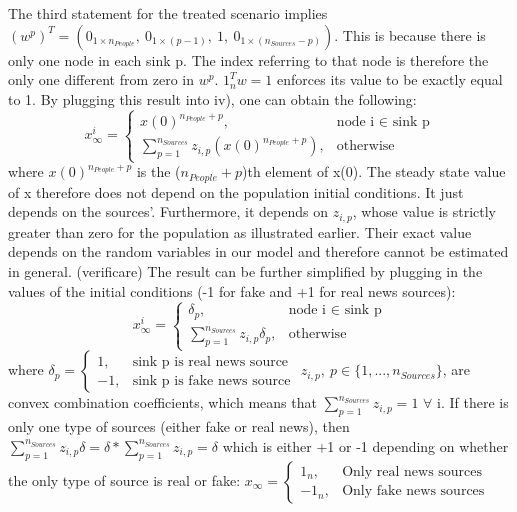 The third statement for the treated scenario implies $(w^p)^T = (0_{1 \times n_{People}},\ 0_{1 \times (p-1)},\ 1,\ 0_{1 \times (n_{Sources}-p)})$. This is because there is only one node in each sink p. The index referring to that node is therefore the only one different from zero in $w^p$. $1_n^Tw=1$ enforces its value to be exactly equal to 1. By plugging this result into iv), one can obtain the following:
$$
x_{\infty}^i = 
\begin{cases}
	x(0)^{n_{People}+p},& \text{node i $\in$ sink p}\\
	\sum_{p=1}^{n_{Sources}} z_{i,p}(x(0)^{n_{People}+p}), & \text{otherwise}
\end{cases}
$$
where $x(0)^{n_{People}+p}$ is the ($n_{People}+p$)th element of x(0). The steady state value of x therefore does not depend on the population initial conditions. It just depends on the sources'. Furthermore, it depends on $z_{i,p}$, whose value is strictly greater than zero for the population as  illustrated earlier. Their exact value depends on the random variables in our model and therefore cannot be estimated in general. (verificare) \newline
The result can be further simplified by plugging in the values of the initial conditions (-1 for fake and +1 for real news sources):
$$
x_{\infty}^i = 
\begin{cases}
\delta_p,& \text{node i $\in$ sink p}\\
\sum_{p=1}^{n_{Sources}} z_{i,p}\delta_p, & \text{otherwise}
\end{cases}
$$
where 
$
\delta_p = 
\begin{cases}
1,& \text{sink p is real news source}\\
-1,& \text{sink p is fake news source}
\end{cases}
$
$z_{i,p},\ p\in\{1,...,n_{Sources}\}$, are convex combination coefficients, which means that $\sum_{p=1}^{n_{Sources}} z_{i,p} = 1$ $\forall$ i.
If there is only one type of sources (either fake or real news), then $\sum_{p=1}^{n_{Sources}} z_{i,p}\delta = \delta*\sum_{p=1}^{n_{Sources}} z_{i,p} = \delta$ which is either +1 or -1 depending on whether the only type of source is real or fake: 
$x_\infty = 
\begin{cases}
1_n,& \text{Only real news sources}\\
-1_n,& \text{Only fake news sources}
\end{cases}$ 
